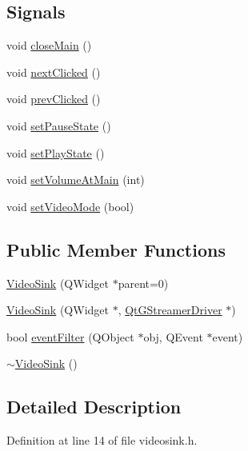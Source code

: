 \subsection*{Signals}
\begin{DoxyCompactItemize}
\item 
void \hyperlink{class_video_sink_a11a4d7487a57ee038cc981c68330ff1f}{close\-Main} ()
\item 
void \hyperlink{class_video_sink_af5d1a52c838dc1c73a23c42e08edcdf7}{next\-Clicked} ()
\item 
void \hyperlink{class_video_sink_ab4bccb7758df596104e7f8a7860b5480}{prev\-Clicked} ()
\item 
void \hyperlink{class_video_sink_acf83d2282f84a361b11a34c55e5498c5}{set\-Pause\-State} ()
\item 
void \hyperlink{class_video_sink_ae11b1fd8e421c6aadee7874bbbd4ff3d}{set\-Play\-State} ()
\item 
void \hyperlink{class_video_sink_ae896101fb43f3fe1f288676de720385d}{set\-Volume\-At\-Main} (int)
\item 
void \hyperlink{class_video_sink_a39bfe6d82df58cab67a2c71ca8fdf536}{set\-Video\-Mode} (bool)
\end{DoxyCompactItemize}
\subsection*{Public Member Functions}
\begin{DoxyCompactItemize}
\item 
\hyperlink{class_video_sink_ae676a83c64d23bfb07e70f357e9358d2}{Video\-Sink} (Q\-Widget $\ast$parent=0)
\item 
\hyperlink{class_video_sink_af83905b1a9d69084878c97d6162a720d}{Video\-Sink} (Q\-Widget $\ast$, \hyperlink{class_qt_g_streamer_driver}{Qt\-G\-Streamer\-Driver} $\ast$)
\item 
bool \hyperlink{class_video_sink_af21e1e41708cecbacd05246c56506752}{event\-Filter} (Q\-Object $\ast$obj, Q\-Event $\ast$event)
\item 
\hyperlink{class_video_sink_a46dc2b553bb0c1430c53db9265970134}{$\sim$\-Video\-Sink} ()
\end{DoxyCompactItemize}


\subsection{Detailed Description}


Definition at line 14 of file videosink.\-h.



